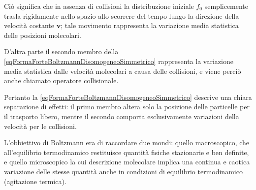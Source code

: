       Ciò significa che in assenza di collisioni la distribuzione iniziale \(f_0\) semplicemente trasla rigidamente nello spazio allo scorrere del tempo lungo la direzione della velocità costante \(\mathbf v\); tale movimento rappresenta la variazione media statistica delle posizioni molecolari.

      D'altra parte il secondo membro della \eqref{eqFormaForteBoltzmannDisomogeneoSimmetrico} rappresenta la variazione media statistica dalle velocità molecolari a causa delle collisioni, e viene perciò anche chiamato operatore collisionale.
      
      Pertanto la \eqref{eqFormaForteBoltzmannDisomogeneoSimmetrico} descrive una chiara separazione di effetti: il primo membro altera solo la posizione delle particelle per il trasporto libero, mentre il secondo comporta esclusivamente variazioni della velocità per le collisioni.

      L'obbiettivo di Boltzmann era di raccordare due mondi: quello macroscopico, che all'equilibrio termodinamico restituisce quantità fisiche stazionarie e ben definite, e quello microscopico la cui descrizione molecolare implica una continua e caotica variazione delle stesse quantità anche in condizioni di equilibrio termodinamico (agitazione termica).

